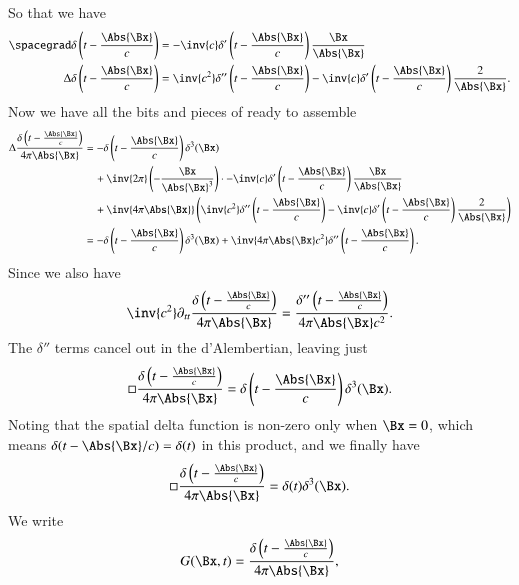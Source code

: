 %
So that we have
%
\begin{equation}\label{eqn:relativisticElectrodynamicsL18:440}
\begin{aligned}
\spacegrad \delta\left(t - \frac{\Abs{\Bx}}{c}\right) &=
-\inv{c} \delta'\left(t - \frac{\Abs{\Bx}}{c}\right) \frac{\Bx}{\Abs{\Bx}} \\
\Delta \delta\left(t - \frac{\Abs{\Bx}}{c}\right) &=
\inv{c^2} \delta''\left(t - \frac{\Abs{\Bx}}{c}\right) -\inv{c} \delta'\left(t - \frac{\Abs{\Bx}}{c}\right) \frac{2}{\Abs{\Bx}}.
\end{aligned}
\end{equation}
%
Now we have all the bits and pieces of  ready to assemble
%
\begin{equation}\label{eqn:relativisticElectrodynamicsL18:920}
\begin{aligned}
\Delta \frac{\delta\left(t - \frac{\Abs{\Bx}}{c}\right)}{4 \pi \Abs{\Bx} }
&=
-\delta\left(t - \frac{\Abs{\Bx}}{c}\right) \delta^3(\Bx) \\
&\quad +\inv{2\pi} \left( - \frac{\Bx}{\Abs{\Bx}^3} \right)
\cdot
-\inv{c} \delta'\left(t - \frac{\Abs{\Bx}}{c}\right) \frac{\Bx}{\Abs{\Bx}} \\
&\quad +
\inv{4 \pi \Abs{\Bx} }
\left(
\inv{c^2} \delta''\left(t - \frac{\Abs{\Bx}}{c}\right) -\inv{c} \delta'\left(t - \frac{\Abs{\Bx}}{c}\right) \frac{2}{\Abs{\Bx}} \right) \\
&=
-\delta\left(t - \frac{\Abs{\Bx}}{c}\right) \delta^3(\Bx)
+\inv{4 \pi \Abs{\Bx} c^2 }
\delta''\left(t - \frac{\Abs{\Bx}}{c}\right).
\end{aligned}
\end{equation}
%
Since we also have
%
\begin{equation}\label{eqn:relativisticElectrodynamicsL18:500}
\inv{c^2} \partial_{tt}
\frac{\delta\left(t - \frac{\Abs{\Bx}}{c}\right)}{4 \pi \Abs{\Bx} }
=
\frac{\delta''\left(t - \frac{\Abs{\Bx}}{c}\right)}{4 \pi \Abs{\Bx} c^2}.
\end{equation}
%
The \(\delta''\) terms cancel out in the d'Alembertian, leaving just
%
\begin{equation}\label{eqn:relativisticElectrodynamicsL18:460}
\square \frac{\delta\left(t - \frac{\Abs{\Bx}}{c}\right)}{4 \pi \Abs{\Bx} }
=
\delta\left(t - \frac{\Abs{\Bx}}{c}\right) \delta^3(\Bx).
\end{equation}
%
Noting that the spatial delta function is non-zero only when \(\Bx = 0\), which means \(\delta(t - \Abs{\Bx}/c) = \delta(t)\) in this product, and we finally have
%
\begin{equation}\label{eqn:relativisticElectrodynamicsL18:480}
\square \frac{\delta\left(t - \frac{\Abs{\Bx}}{c}\right)}{4 \pi \Abs{\Bx} }
=
\delta(t) \delta^3(\Bx).
\end{equation}
%
We write
%
\begin{equation}\label{eqn:relativisticElectrodynamicsL18:520}
G(\Bx, t) = \frac{\delta\left(t - \frac{\Abs{\Bx}}{c}\right)}{4 \pi \Abs{\Bx} },
\end{equation}
